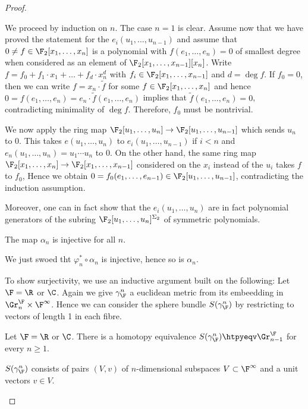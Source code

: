 \begin{proof}
\begin{smallproof}
		We proceed by induction on $n$.
		The case $n = 1$ is clear.
		Assume now that we have proved the statement for the $e_i(u_1, \ldots, u_{n - 1})$ and assume that $0 \neq f \in \F_2[x_1, \ldots, x_n]$ is a polynomial with $f(e_1, \ldots, e_n) = 0$ of smallest degree when considered as an element of $\F_2[x_1, \ldots, x_{n - 1}][x_n]$.
		Write $f = f_0 + f_1 \cdot x_1 + \ldots + f_d \cdot x_n^d$ with $f_i \in \F_2[x_1, \ldots, x_{n - 1}]$ and $d = \deg f$.
		If $f_0 = 0$, then we can write $f = x_n \cdot \tilde{f}$ for some $f \in \F_2[x_1, \ldots, x_n]$ and hence $0 = f(e_1, \ldots, e_n) = e_n \cdot \tilde{f}(e_1, \ldots, e_n)$ implies that $\tilde{f}(e_1, \ldots, e_n) = 0$, contradicting minimality of $\deg f$.
		Therefore, $f_0$ must be nontrivial.

		We now apply the ring map $\F_2[u_1, \ldots, u_n] \to \F_2[u_1, \ldots, u_{n - 1}]$ which sends $u_n$ to 0.
		This takes $e(u_1, \ldots, u_n)$ to $e_i(u_1, \ldots, u_{n - 1})$ if $i < n$ and $e_n(u_1, \ldots, u_n) = u_1 \cdots u_n$ to 0.
		On the other hand, the same ring map $\F_2[x_1, \ldots, x_n] \to \F_2[x_1, \ldots, x_{n - 1}]$ considered on the $x_i$ instead of the $u_i$ takes $f$ to $f_0$, 
		Hence we obtain $0 = f_0(e_1, \ldots, e_{n - 1}) \in \F_2[u_1, \ldots, u_{n - 1}]$, contradicting the induction assumption.
	\end{smallproof}
	Moreover, one can in fact show that the $e_i(u_1, \ldots, u_n)$ are in fact polynomial generators of the subring $\F_2[u_1, \ldots, u_n]^{\Sigma_2}$ of symmetric polynomials.
	\begin{corollary}
		The map $\alpha_n$ is injective for all $n$.
	\end{corollary}
	\begin{smallproof}
		We just swoed tht $\varphi_n^* \circ \alpha_n$ is injective, hence so is $\alpha_n$.
	\end{smallproof}
	To show surjectivity, we use an inductive argument built on the following:
	Let $\F = \R$ or $\C$.
	Again we give $\gamma_\F^n$ a euclidean metric from its embeedding in $\Gr_n^\F \times \F^\infty$.
	Hence we can consider the sphere bundle $S(\gamma_\F^n)$ by restricting to vectors of length 1 in each fibre.
	\begin{proposition}
		Let $\F = \R$ or $\C$.
		There is a homotopy equivalence $S(\gamma_\F^n) \htpyeqv \Gr^\F_{n - 1}$ for every $n \geq 1$.
	\end{proposition}
	\begin{smallproof}
		$S(\gamma_\F^n)$ consists of pairs $(V, v)$ of $n$-dimensional subspaces $V \subset \F^\infty$ and a unit vectors $v \in V$.

\end{smallproof}
\end{proof}
